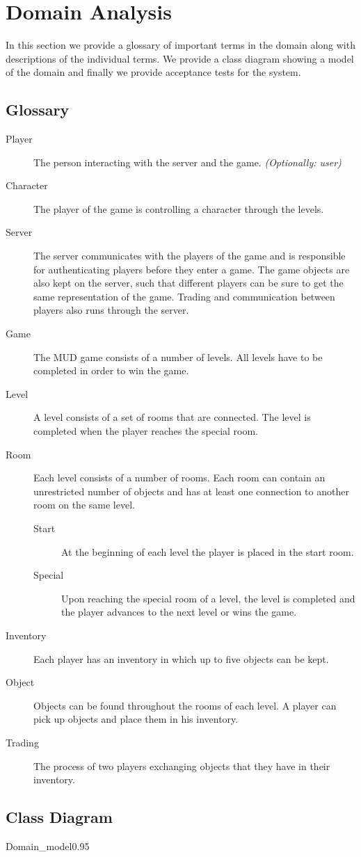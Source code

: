 \section{Domain Analysis}
In this section we provide a glossary of important terms in the domain along with descriptions of the individual terms. We provide a class diagram showing a model of the domain and finally we provide acceptance tests for the system.


\subsection{Glossary}
\begin{description}
	\item[Player] The person interacting with the server and the game. \textit{(Optionally: user)}
	\item[Character] The player of the game is controlling a character through the levels.
	\item[Server] The server communicates with the players of the game and is responsible for authenticating players before they enter a game. The game objects are also kept on the server, such that different players can be sure to get the same representation of the game. Trading and communication between players also runs through the server.
	\item[Game] The MUD game consists of a number of levels. All levels have to be completed in order to win the game.
	\item[Level] A level consists of a set of rooms that are connected. The level is completed when the player reaches the special room.
	\item[Room] Each level consists of a number of rooms. Each room can contain an unrestricted number of objects and has at least one connection to another room on the same level.
		\begin{description}
			\item[Start] At the beginning of each level the player is placed in the start room.		
			\item[Special] Upon reaching the special room of a level, the level is completed and the player advances to the next level or wins the game.
		\end{description}
	\item[Inventory] Each player has an inventory in which up to five objects can be kept.
	\item[Object] Objects can be found throughout the rooms of each level. A player can pick up objects and place them in his inventory.
	\item[Trading] The process of two players exchanging objects that they have in their inventory.
\end{description}


\subsection{Class Diagram}
\begin{myfigure}{Domain_model}{0.95}%
	\caption{Class diagram - showing the domain model.}
	\label{fig:domain-model}
\end{myfigure}
